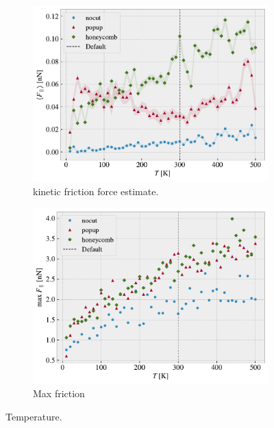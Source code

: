 \begin{figure}[H]
  \centering
  \begin{subfigure}[t]{0.49\textwidth}
      \centering
      \includegraphics[width=\textwidth]{figures/baseline/variables_temp_mean_fixmove_v20.pdf}
      \caption{kinetic friction force estimate.}
      \label{fig:var_temp_mean}
  \end{subfigure}
  \hfill
  \begin{subfigure}[t]{0.49\textwidth}
      \centering
      \includegraphics[width=\textwidth]{figures/baseline/variables_temp_max_fixmove_v20.pdf}
      \caption{Max friction}
      \label{fig:var_temp_max}
  \end{subfigure}
  \hfill
     \caption{Temperature.}
     \label{fig:var_temp}
\end{figure}



